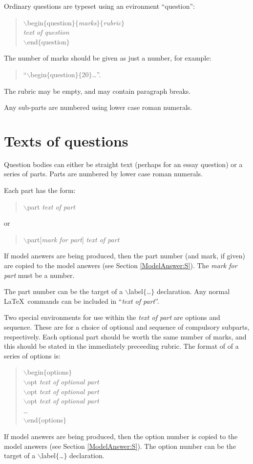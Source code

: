\documentclass[12pt,twoside]{article}
\newcommand{\kwd}[1]{\textsf{#1}}
\newcommand{\cmd}[1]{$\backslash$\textsf{#1}}
\newcommand{\tcmd}[3]{\cmd{#1}$\{$#3{#2}$\}$}
\newcommand{\pcmd}[2]{\tcmd{#1}{#2}{\kwd}}
\begin{document}
Ordinary questions are typeset using an evironment ``\kwd{question}'':
\begin{quote}
        \pcmd{begin}{question}$\{$\emph{marks}$\}\{$\emph{rubric}$\}$\\
        \emph{text of question}\\
        \pcmd{end}{question}
\end{quote}
The number of marks should be given as just a number, for example:
\begin{quote}
``\pcmd{begin}{question}$\{$\kwd{20}$\}$\ldots''.
\end{quote}

The rubric may be empty, and may contain paragraph breaks.

Any sub-parts are numbered using lower case roman numerals.


\section{Texts of questions}
Question bodies can either be straight text (perhaps for an essay
question) or a series of parts.  Parts are numbered by lower case
roman numerals.

Each part has the form:
\begin{quote}
\cmd{part} \emph{text of part}
\end{quote}
or
\begin{quote}
\cmd{part[}\emph{mark for part}\kwd{]} \emph{text of part}
\end{quote}
If model answers are being produced, then the part number (and mark,
if given) are copied to the model answers (see Section
\ref{ModelAnswer:S}).  The \emph{mark for part} must be a number.

The part number can be the target of a \pcmd{label}{\ldots}
declaration.  Any normal \LaTeX\ commands can be included in
``\emph{text of part}''.

Two special environments for use within the \emph{text of part} are
\kwd{options} and \kwd{sequence}.  These are for a choice of optional
and sequence of compulsory subparts, respectively.  Each optional part
should be worth the same number of marks, and this should be stated in
the immediately preceeding rubric.  The format of of a series of
options is:
\begin{quote}
  \pcmd{begin}{options}\\
    \cmd{opt}
      \emph{text of optional part}\\
    \cmd{opt}
      \emph{text of optional part}\\
    \cmd{opt}
      \emph{text of optional part}\\
    \ldots\\
  \pcmd{end}{options}
\end{quote}
If model answers are being produced, then the option number is copied
to the model answers (see Section \ref{ModelAnswer:S}).  The option
number can be the target of a \pcmd{label}{\ldots} declaration.
\end{document}
